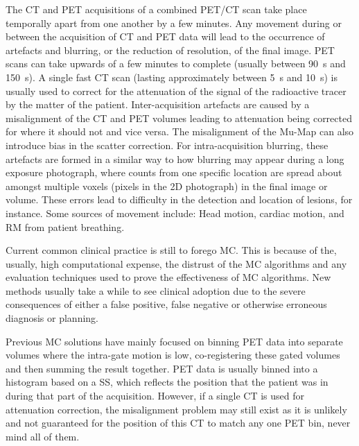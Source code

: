         The \gls{CT} and \gls{PET} acquisitions of a combined \gls{PET}/\gls{CT} scan take place temporally apart from one another by a few minutes. Any movement during or between the acquisition of \gls{CT} and \gls{PET} data will lead to the occurrence of artefacts and blurring, or the reduction of resolution, of the final image. \gls{PET} scans can take upwards of a few minutes to complete (usually between \SI{90}{\second} and \SI{150}{\second}). A single fast \gls{CT} scan (lasting approximately between \SI{5}{\second} and \SI{10}{\second}) is usually used to correct for the attenuation of the signal of the radioactive tracer by the matter of the patient. Inter-acquisition artefacts are caused by a misalignment of the \gls{CT} and \gls{PET} volumes leading to attenuation being corrected for where it should not and vice versa. The misalignment of the \gls{Mu-Map} can also introduce bias in the scatter correction. For intra-acquisition blurring, these artefacts are formed in a similar way to how blurring may appear during a long exposure photograph, where counts from one specific location are spread about amongst multiple voxels (pixels in the \gls{2D} photograph) in the final image or volume. These errors lead to difficulty in the detection and location of lesions, for instance. Some sources of movement include: Head motion, cardiac motion, and \gls{RM} from patient breathing.
    
        Current common clinical practice is still to forego \gls{MC}. This is because of the, usually, high computational expense, the distrust of the \gls{MC} algorithms and any evaluation techniques used to prove the effectiveness of \gls{MC} algorithms. New methods usually take a while to see clinical adoption due to the severe consequences of either a false positive, false negative or otherwise erroneous diagnosis or planning.
    
        Previous \gls{MC} solutions have mainly focused on binning \gls{PET} data into separate volumes where the intra-gate motion is low, co-registering these gated volumes and then summing the result together. \gls{PET} data is usually binned into a histogram based on a \gls{SS}, which reflects the position that the patient was in during that part of the acquisition. However, if a single \gls{CT} is used for attenuation correction, the misalignment problem may still exist as it is unlikely and not guaranteed for the position of this \gls{CT} to match any one \gls{PET} bin, never mind all of them.
        
